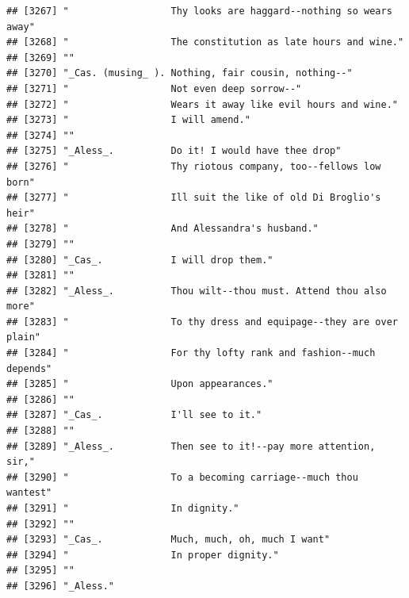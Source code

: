 \documentclass{article}\usepackage[]{graphicx}\usepackage[]{color}
\makeatletter
\newenvironment{kframe}{%
 \def\at@end@of@kframe{}%
 \ifinner\ifhmode%
  \def\at@end@of@kframe{\end{minipage}}%
  \begin{minipage}{\columnwidth}%
 \fi\fi%
 \def\FrameCommand##1{\hskip\@totalleftmargin \hskip-\fboxsep
 \colorbox{shadecolor}{##1}\hskip-\fboxsep
     \hskip-\linewidth \hskip-\@totalleftmargin \hskip\columnwidth}%
 \MakeFramed {\advance\hsize-\width
   \@totalleftmargin\z@ \linewidth\hsize
   \@setminipage}}%
 {\par\unskip\endMakeFramed%
 \at@end@of@kframe}
\newenvironment{knitrout}{}{} %
\makeatother
\begin{document}
\begin{knitrout}
\begin{kframe}
\begin{verbatim}
## [3267] "                  Thy looks are haggard--nothing so wears away"              
## [3268] "                  The constitution as late hours and wine."                  
## [3269] ""                                                                            
## [3270] "_Cas. (musing_ ). Nothing, fair cousin, nothing--"                           
## [3271] "                  Not even deep sorrow--"                                    
## [3272] "                  Wears it away like evil hours and wine."                   
## [3273] "                  I will amend."                                             
## [3274] ""                                                                            
## [3275] "_Aless_.          Do it! I would have thee drop"                             
## [3276] "                  Thy riotous company, too--fellows low born"                
## [3277] "                  Ill suit the like of old Di Broglio's heir"                
## [3278] "                  And Alessandra's husband."                                 
## [3279] ""                                                                            
## [3280] "_Cas_.            I will drop them."                                         
## [3281] ""                                                                            
## [3282] "_Aless_.          Thou wilt--thou must. Attend thou also more"               
## [3283] "                  To thy dress and equipage--they are over plain"            
## [3284] "                  For thy lofty rank and fashion--much depends"              
## [3285] "                  Upon appearances."                                         
## [3286] ""                                                                            
## [3287] "_Cas_.            I'll see to it."                                           
## [3288] ""                                                                            
## [3289] "_Aless_.          Then see to it!--pay more attention, sir,"                 
## [3290] "                  To a becoming carriage--much thou wantest"                 
## [3291] "                  In dignity."                                               
## [3292] ""                                                                            
## [3293] "_Cas_.            Much, much, oh, much I want"                               
## [3294] "                  In proper dignity."                                        
## [3295] ""                                                                            
## [3296] "_Aless."                                                                     

\end{verbatim}
\end{kframe}
\end{knitrout}
\end{document}
